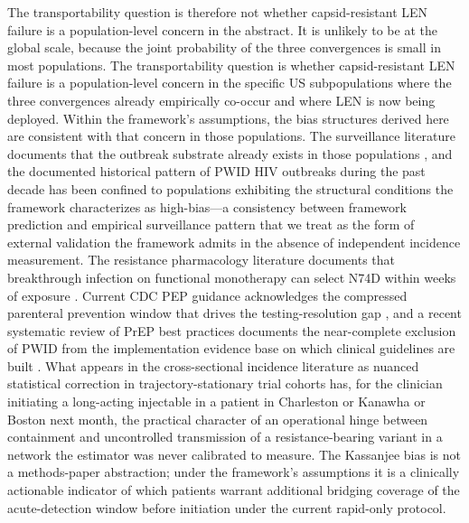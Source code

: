 \documentclass[12pt]{article}
\begin{document}
The transportability question is therefore not whether capsid-resistant LEN failure is a population-level concern in the abstract. It is unlikely to be at the global scale, because the joint probability of the three convergences is small in most populations. The transportability question is whether capsid-resistant LEN failure is a population-level concern in the specific US subpopulations where the three convergences already empirically co-occur and where LEN is now being deployed. Within the framework's assumptions, the bias structures derived here are consistent with that concern in those populations. The surveillance literature documents that the outbreak substrate already exists in those populations \cite{strathdee2020,desjarlais2022,cdc220counties}, and the documented historical pattern of PWID HIV outbreaks during the past decade has been confined to populations exhibiting the structural conditions the framework characterizes as high-bias---a consistency between framework prediction and empirical surveillance pattern that we treat as the form of external validation the framework admits in the absence of independent incidence measurement. The resistance pharmacology literature documents that breakthrough infection on functional monotherapy can select N74D within weeks of exposure \cite{wirden2024,pennetzdorfer2026}. Current CDC PEP guidance acknowledges the compressed parenteral prevention window that drives the testing-resolution gap \cite{tanner2025}, and a recent systematic review of PrEP best practices documents the near-complete exclusion of PWID from the implementation evidence base on which clinical guidelines are built \cite{kamitani2024}. What appears in the cross-sectional incidence literature as nuanced statistical correction in trajectory-stationary trial cohorts has, for the clinician initiating a long-acting injectable in a patient in Charleston or Kanawha or Boston next month, the practical character of an operational hinge between containment and uncontrolled transmission of a resistance-bearing variant in a network the estimator was never calibrated to measure. The Kassanjee bias is not a methods-paper abstraction; under the framework's assumptions it is a clinically actionable indicator of which patients warrant additional bridging coverage of the acute-detection window before initiation under the current rapid-only protocol.
\end{document}

